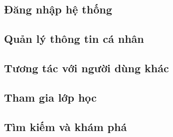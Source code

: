 \documentclass[./../main_file.tex]{subfiles}
\begin{document}
	



	\subsection{Đăng nhập hệ thống }
	\begin{figure}[H]
		\centering
		\resizebox{1.0\textwidth}{!}{}
	\end{figure}
	
	\subsection{Quản lý thông tin cá nhân  }
	\begin{figure}[H]
		\centering
		\resizebox{1.0\textwidth}{!}{}
	\end{figure}
	
	\subsection{Tương tác với người dùng khác }
	\begin{figure}[H]
		\centering
		\resizebox{1.0\textwidth}{!}{}
	\end{figure}
	
	\subsection{Tham gia lớp học }
	\begin{figure}[H]
		\centering
		\resizebox{1.0\textwidth}{!}{}
	\end{figure}
	
	\subsection{Tìm kiếm và khám phá }
	\begin{figure}[H]
		\centering
		\resizebox{1.0\textwidth}{!}{}
	\end{figure}
	
\end{document}
